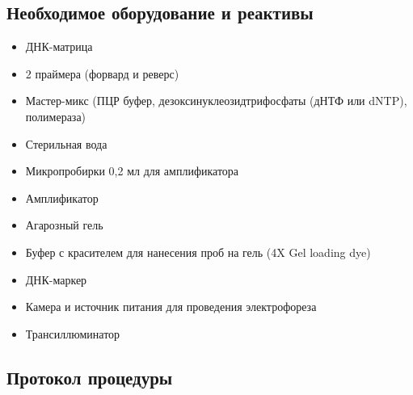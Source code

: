 \subsection*{Необходимое оборудование и реактивы}
\begin{itemize}
\item ДНК-матрица
\item 2 праймера (форвард и реверс)
\item Мастер-микс (ПЦР буфер, дезоксинуклеозидтрифосфаты (дНТФ или dNTP), полимераза)
\item Стерильная вода
\item Микропробирки 0,2 мл для амплификатора
\item Амплификатор
\item Агарозный гель
\item Буфер с красителем для нанесения проб на гель (4X Gel loading dye)
\item ДНК-маркер
\item Камера и источник питания для проведения электрофореза
\item Трансиллюминатор
\end{itemize}

\subsection*{Протокол процедуры}

